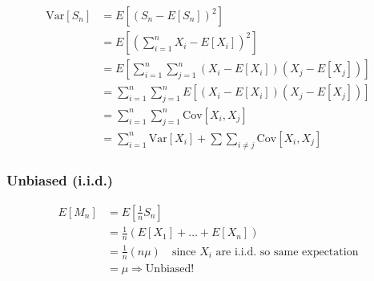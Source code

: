 \begin{derivation}
    \begin{align*}
        \text{Var}[S_n] &= E\left[(S_n - E[S_n])^2\right] \\
        &= E\left[\left(\sum_{i=1}^n X_i - E[X_i]\right)^2\right] \\
        &= E\left[\sum_{i=1}^n \sum_{j=1}^n (X_i - E[X_i])(X_j - E[X_j])\right] \\
        &= \sum_{i=1}^n \sum_{j=1}^n E\left[(X_i - E[X_i])(X_j - E[X_j])\right] \\
        &= \sum_{i=1}^n \sum_{j=1}^n \text{Cov}[X_i, X_j] \\
        &= \sum_{i=1}^n \text{Var}[X_i] + \sum \sum_{i \neq j} \text{Cov}[X_i, X_j]
    \end{align*}
\end{derivation}

\subsubsection{Unbiased (i.i.d.)}
\begin{derivation}
    \begin{align*}
        E[M_n] &= E\left[\frac{1}{n} S_n\right] \\
        &= \frac{1}{n} \left(E[X_1] + \dots + E[X_n]\right) \\
        &= \frac{1}{n} (n\mu) \quad \text{since $X_i$ are i.i.d. so same expectation} \\
        &= \mu \Rightarrow \text{Unbiased!}
    \end{align*}
\end{derivation}

